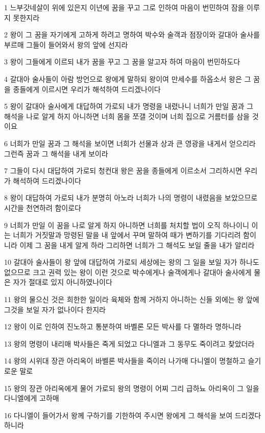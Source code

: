 \par 1 느부갓네살이 위에 있은지 이년에 꿈을 꾸고 그로 인하여 마음이 번민하여 잠을 이루지 못한지라
\par 2 왕이 그 꿈을 자기에게 고하게 하려고 명하여 박수와 술객과 점장이와 갈대아 술사를 부르매 그들이 들어와서 왕의 앞에 선지라
\par 3 왕이 그들에게 이르되 내가 꿈을 꾸고 그 꿈을 알고자 하여 마음이 번민하도다
\par 4 갈대아 술사들이 아람 방언으로 왕에게 말하되 왕이여 만세수를 하옵소서 왕은 그 꿈을 종들에게 이르시면 우리가 해석하여 드리겠나이다
\par 5 왕이 갈대아 술사에게 대답하여 가로되 내가 명령을 내렸나니 너희가 만일 꿈과 그 해석을 나로 알게 하지 아니하면 너희 몸을 쪼갤 것이며 너희 집으로 거름터를 삼을 것이요
\par 6 너희가 만일 꿈과 그 해석을 보이면 너희가 선물과 상과 큰 영광을 내게서 얻으리라 그런즉 꿈과 그 해석을 내게 보이라
\par 7 그들이 다시 대답하여 가로되 청컨대 왕은 꿈을 종들에게 이르소서 그리하시면 우리가 해석하여 드리겠나이다
\par 8 왕이 대답하여 가로되 내가 분명히 아노라 너희가 나의 명령이 내렸음을 보았으므로 시간을 천연하려 함이로다
\par 9 너희가 만일 이 꿈을 나로 알게 하지 아니하면 너희를 처치할 법이 오직 하나이니 이는 너희가 거짓말과 망령된 말을 내 앞에서 꾸며 말하여 때가 변하기를 기다리려 함이니라 이제 그 꿈을 내게 알게 하라 그리하면 너희가 그 해석도 보일 줄을 내가 알리라
\par 10 갈대아 술사들이 왕 앞에 대답하여 가로되 세상에는 왕의 그 일을 보일 자가 하나도 없으므로 크고 권력 있는 왕이 이런 것으로 박수에게나 술객에게나 갈대아 술사에게 물은 자가 절대로 있지 아니하였나이다
\par 11 왕의 물으신 것은 희한한 일이라 육체와 함께 거하지 아니하는 신들 외에는 왕 앞에 그것을 보일 자가 없나이다 한지라
\par 12 왕이 이로 인하여 진노하고 통분하여 바벨론 모든 박사를 다 멸하라 명하니라
\par 13 왕의 명령이 내리매 박사들은 죽게 되었고 다니엘과 그 동무도 죽이려고 찾았더라
\par 14 왕의 시위대 장관 아리옥이 바벨론 박사들을 죽이러 나가매 다니엘이 명철하고 슬기로운 말로
\par 15 왕의 장관 아리옥에게 물어 가로되 왕의 명령이 어찌 그리 급하뇨 아리옥이 그 일을 다니엘에게 고하매
\par 16 다니엘이 들어가서 왕께 구하기를 기한하여 주시면 왕에게 그 해석을 보여 드리겠다 하니라
